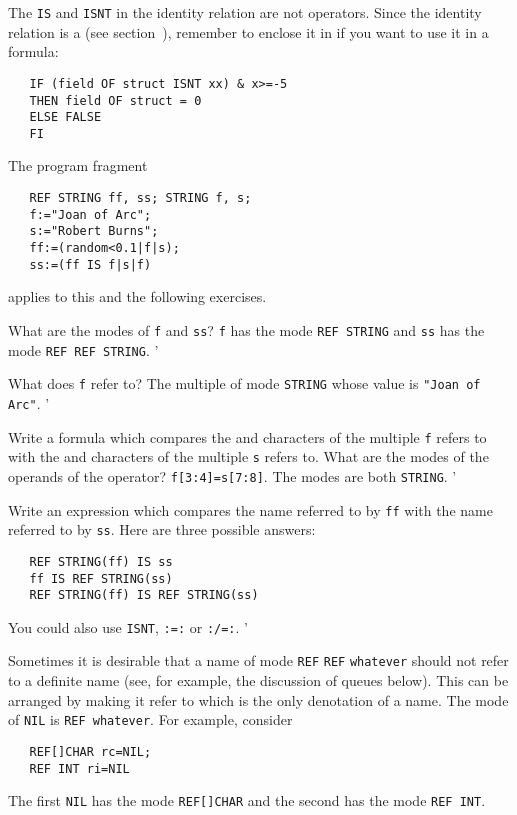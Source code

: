 The \verb|IS| and \verb|ISNT| in the identity relation are not
operators. Since the identity relation is a  (see
section~), remember to enclose it in
 if you want to use it in a formula:
\begin{verbatim}
   IF (field OF struct ISNT xx) & x>=-5
   THEN field OF struct = 0
   ELSE FALSE
   FI
\end{verbatim}

\begin{exercise}
\item The program fragment
\begin{verbatim}
   REF STRING ff, ss; STRING f, s;
   f:="Joan of Arc";
   s:="Robert Burns";
   ff:=(random<0.1|f|s);
   ss:=(ff IS f|s|f)
\end{verbatim}
\noindent
applies to this and the following exercises.

What are the modes of \verb|f| and \verb|ss|? \ans \verb|f| has the
mode \verb|REF STRING| and \verb|ss| has the mode
\verb|REF REF STRING|.
'
\item What does \verb|f| refer to? \ans The multiple of mode
\verb|STRING| whose value is \texttt{"Joan of Arc"}.
'
\item Write a formula which compares the  and 
characters of the multiple \verb|f| refers to with the 
and  characters of the multiple \verb|s| refers to. What
are the modes of the operands of the operator?
\ans \verb|f[3:4]=s[7:8]|. The modes are both \verb|STRING|.
'
\item Write an expression which compares the name referred to by
\verb|ff| with the name referred to by \verb|ss|. \ans Here are three
possible answers:
\begin{verbatim}
   REF STRING(ff) IS ss
   ff IS REF STRING(ss)
   REF STRING(ff) IS REF STRING(ss)
\end{verbatim}
\noindent
You could also use \verb|ISNT|, \verb|:=:| or \verb|:/=:|.
'
\end{exercise}

Sometimes it is desirable that a name of mode \verb|REF| \verb|REF|
\verb|whatever| should not refer to a definite name (see, for
example, the discussion of queues below). This can be arranged by
making it refer to  which is the only denotation of a name.
The mode of \verb|NIL| is \verb|REF whatever|. For example, consider
\begin{verbatim}
   REF[]CHAR rc=NIL;
   REF INT ri=NIL
\end{verbatim}
\noindent
The first \verb|NIL| has the mode \verb|REF[]CHAR| and the second has
the mode \verb|REF INT|.

